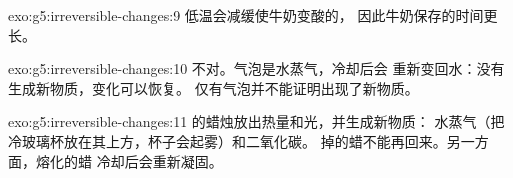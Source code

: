 \begin{solution}{exo:g5:irreversible-changes:9}
低温会减缓使牛奶变酸的，
因此牛奶保存的时间更长。
\end{solution}

\begin{solution}{exo:g5:irreversible-changes:10}
不对。气泡是水蒸气，冷却后会
重新变回水：没有生成新物质，变化可以恢复。
仅有气泡并不能证明出现了新物质。
\end{solution}

\begin{solution}{exo:g5:irreversible-changes:11}
的蜡烛放出热量和光，并生成新物质：
水蒸气（把冷玻璃杯放在其上方，杯子会起雾）和二氧化碳。
掉的蜡不能再回来。另一方面，熔化的蜡
冷却后会重新凝固。
\end{solution}
